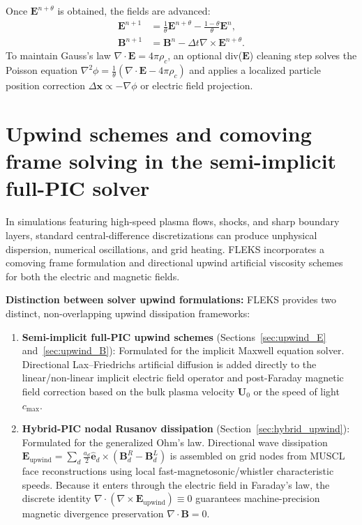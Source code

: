 \documentclass[a4paper, 11pt]{article}
\begin{document}
Once $\mathbf{E}^{n+\theta}$ is obtained, the fields are advanced:
\begin{align}
\mathbf{E}^{n+1} &= \frac{1}{\theta}\mathbf{E}^{n+\theta} - \frac{1-\theta}{\theta}\mathbf{E}^n, \\
\mathbf{B}^{n+1} &= \mathbf{B}^n - \Delta t \nabla \times \mathbf{E}^{n+\theta}.
\end{align}
To maintain Gauss's law $\nabla \cdot \mathbf{E} = 4\pi \rho_c$, an optional div($\mathbf{E}$) cleaning step solves the Poisson equation $\nabla^2 \phi = \frac{1}{\theta}(\nabla \cdot \mathbf{E} - 4\pi \rho_c)$ and applies a localized particle position correction $\Delta \mathbf{x} \propto -\nabla \phi$ or electric field projection.

\section{Upwind schemes and comoving frame solving in the semi-implicit full-PIC solver}

In simulations featuring high-speed plasma flows, shocks, and sharp boundary layers, standard central-difference discretizations can produce unphysical dispersion, numerical oscillations, and grid heating. FLEKS incorporates a comoving frame formulation and directional upwind artificial viscosity schemes for both the electric and magnetic fields.

\noindent\textbf{Distinction between solver upwind formulations:} FLEKS provides two distinct, non-overlapping upwind dissipation frameworks:
\begin{enumerate}
  \item \textbf{Semi-implicit full-PIC upwind schemes} (Sections~\ref{sec:upwind_E} and~\ref{sec:upwind_B}): Formulated for the implicit Maxwell equation solver. Directional Lax--Friedrichs artificial diffusion is added directly to the linear/non-linear implicit electric field operator and post-Faraday magnetic field correction based on the bulk plasma velocity $\mathbf{U}_0$ or the speed of light $c_{\max}$.
  \item \textbf{Hybrid-PIC nodal Rusanov dissipation} (Section~\ref{sec:hybrid_upwind}): Formulated for the generalized Ohm's law. Directional wave dissipation $\mathbf{E}_{\text{upwind}} = \sum_d \frac{a_d}{2} \hat{\mathbf{e}}_d \times (\mathbf{B}^R_d - \mathbf{B}^L_d)$ is assembled on grid nodes from MUSCL face reconstructions using local fast-magnetosonic/whistler characteristic speeds. Because it enters through the electric field in Faraday's law, the discrete identity $\nabla \cdot (\nabla \times \mathbf{E}_{\text{upwind}}) \equiv 0$ guarantees machine-precision magnetic divergence preservation $\nabla \cdot \mathbf{B} = 0$.
\end{enumerate}
\end{document}
